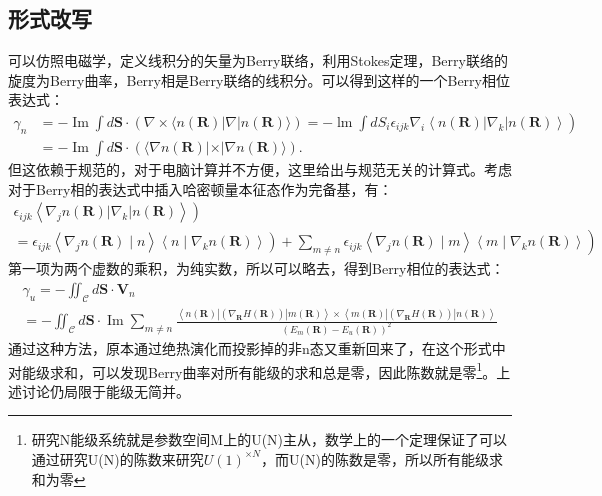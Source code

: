 \documentclass[10pt,openany]{book}
\theoremstyle{thmstyle} %
\theoremstyle{defstyle} %
\theoremstyle{prostyle} %
\begin{document}
\subsection{形式改写}
可以仿照电磁学，定义线积分的矢量为Berry联络，利用Stokes定理，Berry联络的旋度为Berry曲率，Berry相是Berry联络的线积分。可以得到这样的一个Berry相位表达式：
\begin{equation}
	\begin{aligned}
		\gamma_n & \left.=-\operatorname{Im} \int d \mathbf{S} \cdot(\nabla \times\langle n(\mathbf{R})|\nabla| n(\mathbf{R})\rangle)=-\operatorname{lm} \int d S_i \epsilon_{i j k} \nabla_i\left\langle n(\mathbf{R})\left|\nabla_k\right| n(\mathbf{R})\right\rangle\right) \\
		& =-\operatorname{Im} \int d \mathbf{S} \cdot(\langle\nabla n(\mathbf{R})|\times| \nabla n(\mathbf{R})\rangle) .
		\end{aligned}
\end{equation}
但这依赖于规范的，对于电脑计算并不方便，这里给出与规范无关的计算式。考虑对于Berry相的表达式中插入哈密顿量本征态作为完备基，有：
\begin{equation}
	\begin{gathered}
		\left.\epsilon_{i j k}\left\langle\nabla_j n(\mathbf{R})\left|\nabla_k\right| n(\mathbf{R})\right\rangle\right) \\
		\left.\left.=\epsilon_{i j k}\left\langle\nabla_j n(\mathbf{R}) \mid n\right\rangle\left\langle n \mid \nabla_k n(\mathbf{R})\right\rangle\right)+\sum_{m \neq n} \epsilon_{i j k}\left\langle\nabla_j n(\mathbf{R}) \mid m\right\rangle\left\langle m \mid \nabla_k n(\mathbf{R})\right\rangle\right)
		\end{gathered}
\end{equation}
第一项为两个虚数的乘积，为纯实数，所以可以略去，得到Berry相位的表达式：
\begin{equation}
	\begin{gathered}
		\gamma_u=-\iint_{\mathcal{C}} d \mathbf{S} \cdot \mathbf{V}_n \\
		=-\iint_{\mathcal{C}} d \mathbf{S} \cdot \operatorname{Im} \sum_{m \neq n} \frac{\left\langle n(\mathbf{R})\left|\left(\nabla_{\mathbf{R}} H(\mathbf{R})\right)\right| m(\mathbf{R})\right\rangle \times\left\langle m(\mathbf{R})\left|\left(\nabla_{\mathbf{R}} H(\mathbf{R})\right)\right| n(\mathbf{R})\right\rangle}{\left(E_m(\mathbf{R})-E_u(\mathbf{R})\right)^2}
		\end{gathered}
\end{equation}
通过这种方法，原本通过绝热演化而投影掉的非n态又重新回来了，在这个形式中对能级求和，可以发现Berry曲率对所有能级的求和总是零，因此陈数就是零\footnote{研究N能级系统就是参数空间M上的U(N)主从，数学上的一个定理保证了可以通过研究U(N)的陈数来研究$ U(1)^{\times N} $，而U(N)的陈数是零，所以所有能级求和为零 }。上述讨论仍局限于能级无简并。
\end{document}
